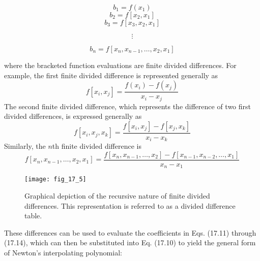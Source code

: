 \documentclass[../main.tex]{subfiles}
\begin{document}
\begin{equation}
    \tag{17.11}
b_{1} =f\left(x_{1}\right)
\end{equation}
\begin{equation}
    \tag{17.12}
b_{2} =f\left[x_{2}, x_{1}\right]
\end{equation}
\begin{equation}
    \tag{17.13}
b_{3} =f\left[x_{3}, x_{2}, x_{1}\right]
\end{equation}

$$\vdots$$

\begin{equation}
    \tag{17.14}
b_{n} =f\left[x_{n}, x_{n-1}, \ldots, x_{2}, x_{1}\right]
\end{equation}

where the bracketed function evaluations are finite divided differences. For example, the first finite divided difference is represented generally as
\begin{equation}
    \tag{17.15}
f\left[x_{i}, x_{j}\right]=\frac{f\left(x_{i}\right)-f\left(x_{j}\right)}{x_{i}-x_{j}}
\end{equation}
The second finite divided difference, which represents the difference of two first divided differences, is expressed generally as
\begin{equation}
    \tag{17.16}
f\left[x_{i}, x_{j}, x_{k}\right]=\frac{f\left[x_{i}, x_{j}\right]-f\left[x_{j}, x_{k}\right]}{x_{i}-x_{k}}
\end{equation}
Similarly, the $n$th finite divided difference is
\begin{equation}
    \tag{17.17}
f\left[x_{n}, x_{n-1}, \ldots, x_{2}, x_{1}\right]=\frac{f\left[x_{n}, x_{n-1}, \ldots, x_{2}\right]-f\left[x_{n-1}, x_{n-2}, \ldots, x_{1}\right]}{x_{n}-x_{1}}
\end{equation}

\begin{figure}[H]
    \centering
    \texttt{[image: fig\_17\_5]}
   \caption{\textsf{Graphical depiction of the recursive nature of finite divided differences. This representation is
   referred to as a divided difference table.}}\label{fig:fig_17_5}
\end{figure}
These differences can be used to evaluate the coefficients in Eqs. (17.11) through (17.14),
which can then be substituted into Eq. (17.10) to yield the general form of Newton's interpolating polynomial:
\end{document}
